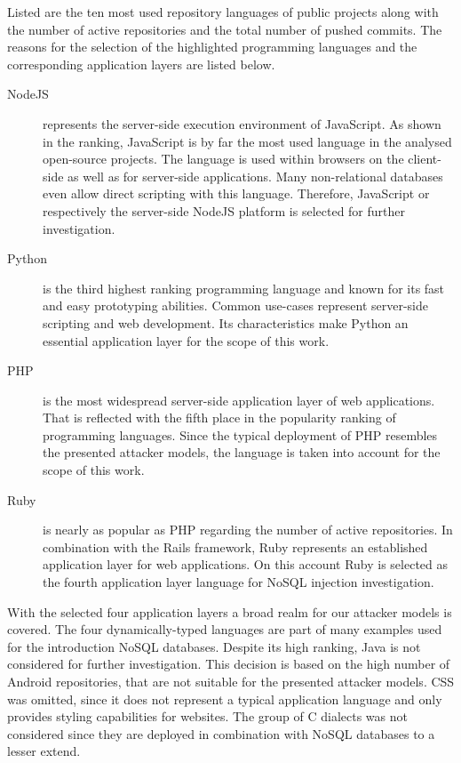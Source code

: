 Listed are the ten most used repository languages of public projects along with the number of active repositories and the total number of pushed commits. The reasons for the selection of the highlighted programming languages and the corresponding application layers are listed below.

\begin{description}
\item [NodeJS] represents the server-side execution environment of JavaScript. As shown in the ranking, JavaScript is by far the most used language in the analysed open-source projects. The language is used within browsers on the client-side as well as for server-side applications. Many non-relational databases even allow direct scripting with this language. Therefore, JavaScript or respectively the server-side NodeJS platform is selected for further investigation.
\item [Python] is the third highest ranking programming language and known for its fast and easy prototyping abilities. Common use-cases represent server-side scripting and web development. Its characteristics make Python an essential application layer for the scope of this work.
\item [PHP] is the most widespread server-side application layer of web applications. That is reflected with the fifth place in the popularity ranking of programming languages. Since the typical deployment of PHP resembles the presented attacker models, the language is taken into account for the scope of this work.
\item [Ruby] is nearly as popular as PHP regarding the number of active repositories. In combination with the Rails framework, Ruby represents an established application layer for web applications. On this account Ruby is selected as the fourth application layer language for NoSQL injection investigation.
\end{description}

With the selected four application layers a broad realm for our attacker models is covered. The four dynamically-typed languages are part of many examples used for the introduction NoSQL databases. Despite its high ranking, Java is not considered for further investigation. This decision is based on the high number of Android repositories, that are not suitable for the presented attacker models. CSS was omitted, since it does not represent a typical application language and only provides styling capabilities for websites. The group of C dialects was not considered since they are deployed in combination with NoSQL databases to a lesser extend.

